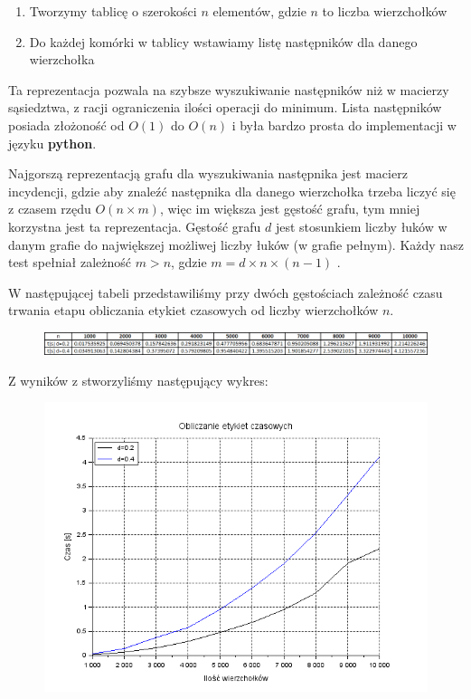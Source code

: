 \documentclass{article}
\begin{document}
\begin{enumerate}
\item Tworzymy tablicę o szerokości $n$ elementów, gdzie $n$ to liczba wierzchołków
\item Do każdej komórki w tablicy wstawiamy listę następników dla danego wierzchołka
\end{enumerate}

Ta reprezentacja pozwala na szybsze wyszukiwanie następników niż w macierzy sąsiedztwa, z racji ograniczenia ilości operacji do minimum. Lista następników posiada złożoność od $O(1)$ do $O(n)$ i była bardzo prosta do implementacji w języku \textbf{python}.

Najgorszą reprezentacją grafu dla wyszukiwania następnika jest macierz incydencji, gdzie aby znaleźć następnika dla danego wierzchołka trzeba liczyć się z czasem rzędu $O(n\times m)$, więc im większa jest gęstość grafu, tym mniej korzystna jest ta reprezentacja. Gęstość grafu $d$ jest stosunkiem liczby łuków w danym grafie do największej możliwej liczby łuków (w grafie pełnym). Każdy nasz test spełniał zależność $m>n$, gdzie $m=d\times n\times (n-1)$ .

W następującej tabeli przedstawiliśmy przy dwóch gęstościach zależność czasu trwania etapu obliczania etykiet czasowych od liczby wierzchołków $n$.

\begin{figure}[h]
\centering
  \includegraphics[width=1.0\linewidth]{etykiety_tabela}
  \label{fig:etykiety_tabela}
\end{figure}%

Z wyników z stworzyliśmy następujący wykres:

\begin{figure}[h]
\centering
  \includegraphics[width=0.5\linewidth]{etykiety}
  \label{fig:etykiety}
\end{figure}%
\end{document}
